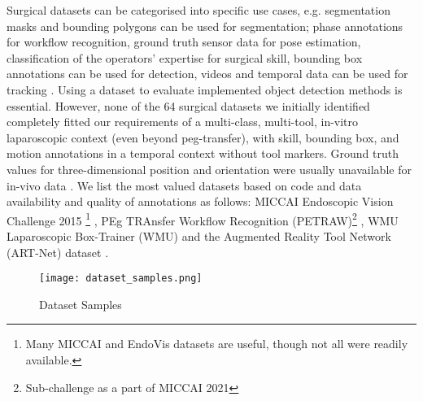 Surgical datasets can be categorised into specific use cases, e.g. segmentation masks and bounding polygons can be used for segmentation; phase annotations for workflow recognition, ground truth sensor data for pose estimation, classification of the operators' expertise for surgical skill, bounding box annotations can be used for detection, videos and temporal data can be used for tracking  \cite{rodrigues_surgical_2022}. Using a dataset to evaluate implemented object detection methods is essential. However, none of the 64 surgical datasets we initially identified completely fitted our requirements of a multi-class, multi-tool, in-vitro laparoscopic context (even beyond peg-transfer), with skill, bounding box, and motion annotations in a temporal context without tool markers. Ground truth values for three-dimensional position and orientation were usually unavailable for in-vivo data \cite{allan_toward_2013}. We list the most valued datasets based on code and data availability and quality of annotations as follows: MICCAI Endoscopic Vision Challenge 2015 \footnote{Many MICCAI and EndoVis datasets are useful, though not all were readily available.} \cite{bernal_comparative_2017}, PEg TRAnsfer Workflow Recognition (PETRAW)\footnote{Sub-challenge as a part of MICCAI 2021} \cite{huaulme_peg_2022}, WMU Laparoscopic Box-Trainer (WMU) \cite{fathabadi_box-trainer_2022} and the Augmented Reality Tool Network (ART-Net) dataset \cite{hasan_detection_2021}. 

\begin{figure}[htbp]
    \centering
    \vspace*{-2mm}
    \texttt{[image: dataset\_samples.png]}
    \vspace*{-8mm}
    \caption{Dataset Samples}
    \vspace*{-4mm}
    \label{fig:dataset_samples}
\end{figure}

